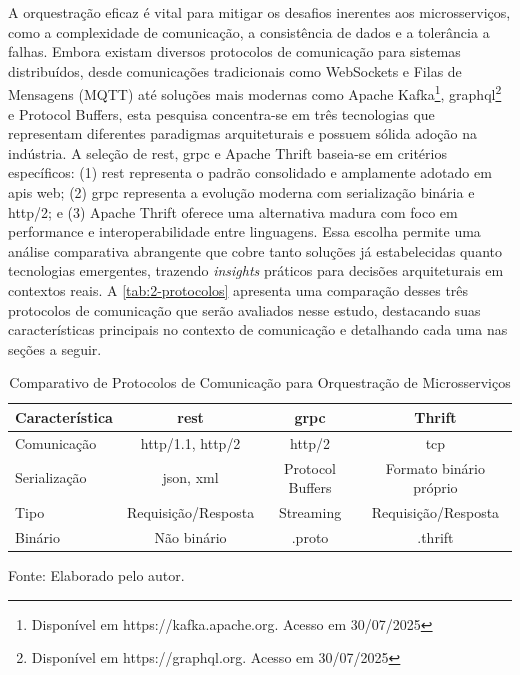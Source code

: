 A orquestração eficaz é vital para mitigar os desafios inerentes aos microsserviços, como a complexidade de comunicação, a consistência de dados e a tolerância a falhas. Embora existam diversos protocolos de comunicação para sistemas distribuídos, desde comunicações tradicionais como WebSockets e Filas de Mensagens (MQTT) até soluções mais modernas como Apache Kafka\footnote{Disponível em https://kafka.apache.org. Acesso em 30/07/2025}, \acrshort{graphql}\footnote{Disponível em  https://graphql.org. Acesso em 30/07/2025} e Protocol Buffers, esta pesquisa concentra-se em três tecnologias que representam diferentes paradigmas arquiteturais e possuem sólida adoção na indústria\cite{jetbrains_state_2024}. A seleção de \gls{rest}, \gls{grpc} e Apache Thrift baseia-se em critérios específicos: (1) \gls{rest} representa o padrão consolidado e amplamente adotado em \gls{api}s web; (2) \gls{grpc} representa a evolução moderna com serialização binária e \acrshort{http}/2; e (3) Apache Thrift oferece uma alternativa madura com foco em performance e interoperabilidade entre linguagens. Essa escolha permite uma análise comparativa abrangente que cobre tanto soluções já estabelecidas quanto tecnologias emergentes, trazendo \textit{insights} práticos para decisões arquiteturais em contextos reais. A \autoref{tab:2-protocolos} apresenta uma comparação desses três protocolos de comunicação que serão avaliados nesse estudo, destacando suas características principais no contexto de comunicação e detalhando cada uma nas seções a seguir.

\begin{table}[H]
\caption{Comparativo de Protocolos de Comunicação para Orquestração de Microsserviços}
\centering
\begin{tabularx}{\textwidth}{|X|c|c|c|}
\hline
\textbf{Característica} & \textbf{\gls{rest}} & \textbf{\gls{grpc}} & \textbf{Thrift} \\
\hline
Comunicação & \acrshort{http}/1.1, \acrshort{http}/2 & \acrshort{http}/2 & \acrshort{tcp} \\
\hline
Serialização & \acrshort{json}, \acrshort{xml} & Protocol Buffers & Formato binário próprio \\
\hline
Tipo & Requisição/Resposta & Streaming & Requisição/Resposta \\
\hline
Binário & Não binário & .proto & .thrift \\
\hline
\end{tabularx}
\label{tab:2-protocolos}
\vspace{-0.2cm}
{\raggedright \footnotesize Fonte: Elaborado pelo autor.\par}
\end{table}

